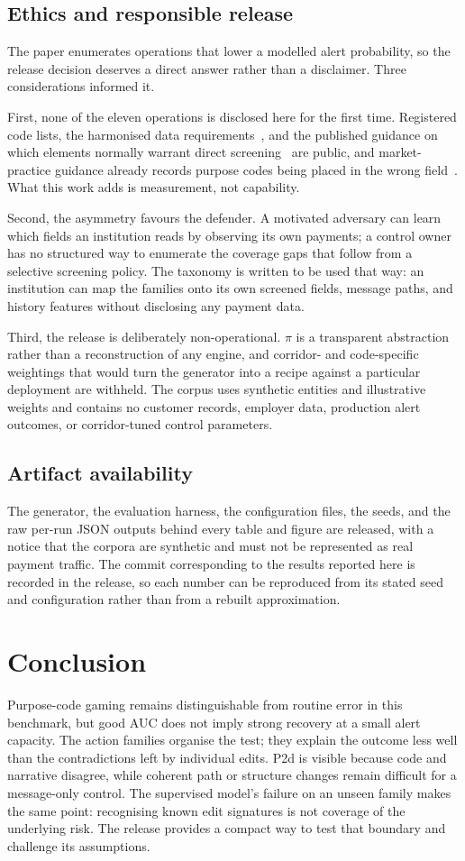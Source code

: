 \documentclass[conference]{IEEEtran}
\begin{document}
\subsection{Ethics and responsible release}
The paper enumerates operations that lower a modelled alert probability, so the
release decision deserves a direct answer rather than a disclaimer. Three
considerations informed it.
 
First, none of the eleven operations is disclosed here for the first time.
Registered code lists, the harmonised data requirements~\cite{cpmi2026}, and
the published guidance on which elements normally warrant direct
screening~\cite{swiftgp2021} are public, and market-practice guidance already
records purpose codes being placed in the wrong field~\cite{pmpg2024}. What
this work adds is measurement, not capability.
 
Second, the asymmetry favours the defender. A motivated adversary can learn
which fields an institution reads by observing its own payments; a control
owner has no structured way to enumerate the coverage gaps that follow from a
selective screening policy. The taxonomy is written to be used that way: an
institution can map the families onto its own screened fields, message paths,
and history features without disclosing any payment data.
 
Third, the release is deliberately non-operational. $\pi$ is a transparent
abstraction rather than a reconstruction of any engine, and corridor- and
code-specific weightings that would turn the generator into a recipe against a
particular deployment are withheld. The corpus uses synthetic entities and
illustrative weights and contains no customer records, employer data,
production alert outcomes, or corridor-tuned control parameters.
 
\subsection{Artifact availability}
The generator, the evaluation harness, the configuration files, the seeds, and
the raw per-run JSON outputs behind every table and figure are released, with a
notice that the corpora are synthetic and must not be represented as real
payment traffic. The commit corresponding to the results reported here is
recorded in the release, so each number can be reproduced from its stated seed
and configuration rather than from a rebuilt approximation.
\section{Conclusion}
Purpose-code gaming remains distinguishable from routine error in this
benchmark, but good AUC does not imply strong recovery at a small alert
capacity. The action families organise the test; they explain the outcome less
well than the contradictions left by individual edits. P2d is visible because
code and narrative disagree, while coherent path or structure changes remain
difficult for a message-only control. The supervised model's failure on an
unseen family makes the same point: recognising known edit signatures is not
coverage of the underlying risk. The release provides a compact way to test that boundary and challenge
its assumptions.
\end{document}
